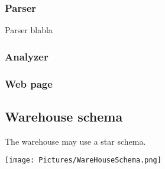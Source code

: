 \subsubsection{Parser}
Parser blabla
\subsubsection{Analyzer}
\subsubsection{Web page}

\subsection{Warehouse schema}
The warehouse may use a star schema.
\begin{center}
\texttt{[image: Pictures/WareHouseSchema.png]}
\end{center}   